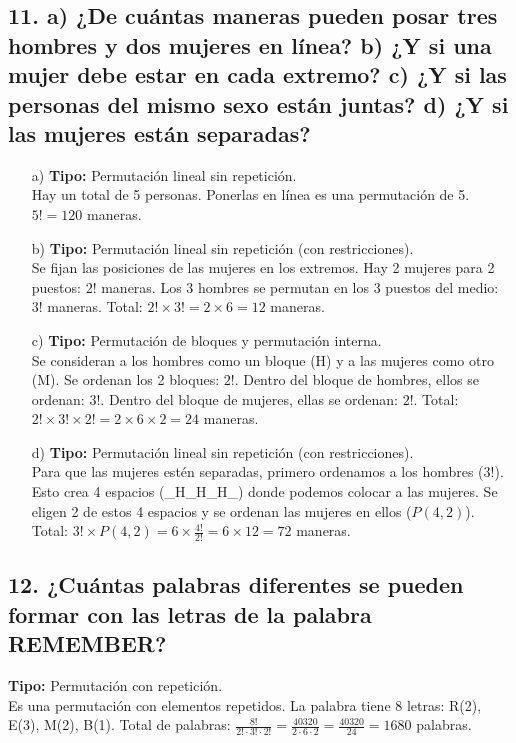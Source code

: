 \documentclass[11pt]{article}
\begin{document}
    \subsection*{11. a) ¿De cuántas maneras pueden posar tres hombres y dos mujeres en línea? b) ¿Y si una mujer debe estar en cada extremo? c) ¿Y si las personas del mismo sexo están juntas? d) ¿Y si las mujeres están separadas?}
    \begin{itemize}
        \item[a)] \textbf{Tipo:} Permutación lineal sin repetición. \\
        Hay un total de 5 personas. Ponerlas en línea es una permutación de 5. $5! = 120$ maneras.
        \item[b)] \textbf{Tipo:} Permutación lineal sin repetición (con restricciones). \\
        Se fijan las posiciones de las mujeres en los extremos. Hay 2 mujeres para 2 puestos: $2!$ maneras. Los 3 hombres se permutan en los 3 puestos del medio: $3!$ maneras. Total: $2! \times 3! = 2 \times 6 = 12$ maneras.
        \item[c)] \textbf{Tipo:} Permutación de bloques y permutación interna. \\
        Se consideran a los hombres como un bloque (H) y a las mujeres como otro (M). Se ordenan los 2 bloques: $2!$. Dentro del bloque de hombres, ellos se ordenan: $3!$. Dentro del bloque de mujeres, ellas se ordenan: $2!$. Total: $2! \times 3! \times 2! = 2 \times 6 \times 2 = 24$ maneras.
        \item[d)] \textbf{Tipo:} Permutación lineal sin repetición (con restricciones). \\
        Para que las mujeres estén separadas, primero ordenamos a los hombres ($3!$). Esto crea 4 espacios (\_H\_H\_H\_) donde podemos colocar a las mujeres. Se eligen 2 de estos 4 espacios y se ordenan las mujeres en ellos ($P(4,2)$). Total: $3! \times P(4,2) = 6 \times \frac{4!}{2!} = 6 \times 12 = 72$ maneras.
    \end{itemize}

    \subsection*{12. ¿Cuántas palabras diferentes se pueden formar con las letras de la palabra REMEMBER?}
    \textbf{Tipo:} Permutación con repetición. \\
    Es una permutación con elementos repetidos. La palabra tiene 8 letras: R(2), E(3), M(2), B(1).
    Total de palabras: $\frac{8!}{2! \cdot 3! \cdot 2!} = \frac{40320}{2 \cdot 6 \cdot 2} = \frac{40320}{24} = 1680$ palabras.
\end{document}
